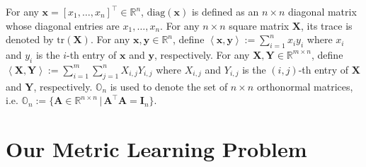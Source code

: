 \documentclass[10pt,onecolumn]{article}
\theoremstyle{definition}
\theoremstyle{definition}
\theoremstyle{definition}
\theoremstyle{definition}
\theoremstyle{definition}
\theoremstyle{theorem}
\newcommand{\0}{{\bm{0}}}
\newcommand{\1}{{\bm{1}}}
\newcommand{\x}{{\bm{x}}}
\newcommand{\y}{{\bm{y}}}
\newcommand{\vA}{{\bm{A}}}
\newcommand{\vC}{{\bm{C}}}
\newcommand{\vI}{{\bm{I}}}
\newcommand{\bN}{{\mathbb{N}}}
\newcommand{\bO}{{\mathbb{O}}}
\newcommand{\cP}{{\mathcal{P}}}
\newcommand{\bR}{{\mathbb{R}}}
\newcommand{\X}{{\bm{X}}}
\newcommand{\Y}{{\bm{Y}}}
\newcommand{\vDel}{{\bm{\Delta}}}
\begin{document}
%
%
For any $\x = \left[x_{1},\dots,x_{n}\right]^\top\in\bR^{n}$,
$\text{diag}(\x)$ is defined as an $n\times n$
diagonal matrix whose diagonal entries are
$x_{1},\dots,x_{n}$.
%
For any $n\times n$ square matrix $\X$, its trace is denoted by
$\text{tr}(\X)$.
%
For any $\x,\y\in\bR^{n}$, define $\left<\x,\y\right> := \sum_{i=1}^{n}x_{i}y_{i}$
where $x_{i}$ and $y_{i}$ is the $i$-th entry of $\x$ and $\y$, respectively.
%
For any $\X,\Y\in\bR^{m\times n}$,
define $\left<\X,\Y\right> := \sum_{i=1}^{m}\sum_{j=1}^{n}X_{i,j}Y_{i,j}$
where $X_{i,j}$ and $Y_{i,j}$ is the $(i,j)$-th entry of $\X$ and $\Y$, respectively.
%
%
$\bO_{n}$ is used to denote the set of $n\times n$ orthonormal
matrices, i.e.
$\bO_{n} := \{\vA \in\bR^{n\times n} \,|\, \vA^\top \vA = \vI_{n}\}.$
%
\section{Our Metric Learning Problem}
%
\end{document}

